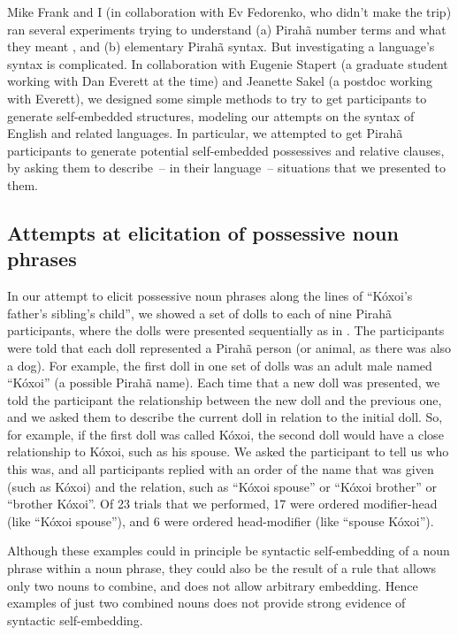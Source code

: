 \documentclass{article}
\begin{document}
Mike Frank and I (in collaboration with Ev Fedorenko, who didn’t make the trip) ran several experiments trying to understand (a) Pirahã number terms and what they meant \citep{frank2008language}, and (b) elementary Pirahã syntax. But investigating a language’s syntax is complicated.  In collaboration with Eugenie Stapert (a graduate student working with Dan Everett at the time) and Jeanette Sakel (a postdoc working with Everett), we designed some simple methods to try to get participants to generate self-embedded structures, modeling our attempts on the syntax of English and related languages. In particular, we attempted to get Pirahã participants to generate potential self-embedded possessives and relative clauses, by asking them to describe~-- in their language~-- situations that we presented to them.

\subsection{Attempts at elicitation of possessive noun phrases}

In our attempt to elicit possessive noun phrases along the lines of ``Kóxoi’s father’s sibling’s child'', we showed a set of dolls to each of nine Pirahã participants, where the dolls were presented sequentially as in . The participants were told that each doll represented a Pirahã person (or animal, as there was also a dog). For example, the first doll in one set of dolls was an adult male named “Kóxoi” (a possible Pirahã name). Each time that a new doll was presented, we told the participant the relationship between the new doll and the previous one, and we asked them to describe the current doll in relation to the initial doll.  So, for example, if the first doll was called Kóxoi, the second doll would have a close relationship to Kóxoi, such as his spouse. We asked the participant to tell us who this was, and all participants  replied with an order of the name that was given (such as Kóxoi) and the relation, such as ``Kóxoi spouse'' or ``Kóxoi brother'' or ``brother Kóxoi''. Of 23 trials that we performed, 17 were ordered modifier-head (like ``Kóxoi spouse''), and 6 were ordered head-modifier (like ``spouse Kóxoi'').

Although these examples could in principle be syntactic self-embedding of a noun phrase within a noun phrase, they could also be the result of a rule that allows only two nouns to combine, and does not allow arbitrary embedding.  Hence examples of just two combined nouns does not provide strong evidence of syntactic self-embedding.
\end{document}

